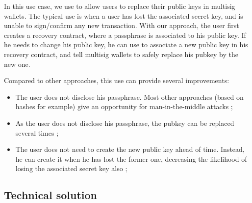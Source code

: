\documentclass[10pt,a4paper]{article}
\begin{document}
In this use case, we use \zksnarks{} to allow users to replace their
public keys in multisig wallets. The typical use is when a user has
lost the associated secret key, and is unable to sign/confirm any new
transaction. With our approach, the user first creates a recovery
contract, where a passphrase is associated to his public key. If he
needs to change his public key, he can use \zksnarks{} to associate a new
public key in his recovery contract, and tell multisig wallets to
safely replace his pubkey by the new one.

Compared to other approaches, this use can provide several
improvements:
\begin{itemize}
\item The user does not disclose his passphrase. Most other approaches
  (based on hashes for example) give an opportunity for
  man-in-the-middle attacks ;
\item As the user does not disclose his passphrase, the pubkey can be
  replaced several times ;
\item The user does not need to create the new public key ahead of
  time. Instead, he can create it when he has lost the former one,
  decreasing the likelihood of losing the associated secret key also ;
\end{itemize}

\subsection{Technical solution}
\end{document}
